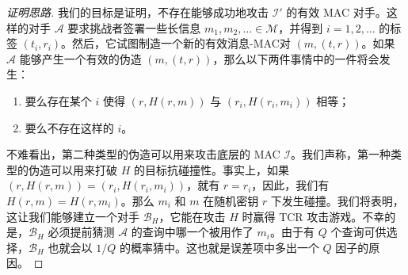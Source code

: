 \begin{proof}[证明思路]
我们的目标是证明，不存在能够成功地攻击 $\mathcal{I}'$ 的有效 MAC 对手。这样的对手 $\mathcal{A}$ 要求挑战者签署一些长信息 $m_1,m_2,\dots\in\mathcal{M}$，并得到 $i=1,2,\dots$ 的标签 $(t_i,r_i)$。然后，它试图制造一个新的有效消息-MAC对 $(m,(t,r))$。如果 $\mathcal{A}$ 能够产生一个有效的伪造 $(m,(t,r))$，那么以下两件事情中的一件将会发生：
\begin{enumerate}
	\item 要么存在某个 $i$ 使得 $(r,H(r,m))$ 与 $(r_i,H(r_i,m_i))$ 相等；
	\item 要么不存在这样的 $i$。
\end{enumerate}
不难看出，第二种类型的伪造可以用来攻击底层的 MAC $\mathcal{I}$。我们声称，第一种类型的伪造可以用来打破 $H$ 的目标抗碰撞性。事实上，如果 $(r,H(r,m))=(r_i,H(r_i,m_i))$，就有 $r=r_i$，因此，我们有 $H(r,m)=H(r,m_i)$。那么 $m_i$ 和 $m$ 在随机密钥 $r$ 下发生碰撞。我们将表明，这让我们能够建立一个对手 $\mathcal{B}_H$，它能在攻击 $H$ 时赢得 TCR 攻击游戏。不幸的是，$\mathcal{B}_H$ 必须提前猜测 $\mathcal{A}$ 的查询中哪一个被用作了 $m_i$。由于有 $Q$ 个查询可供选择，$\mathcal{B}_H$ 也就会以 $1/Q$ 的概率猜中。这也就是误差项中多出一个 $Q$ 因子的原因。
\end{proof}

